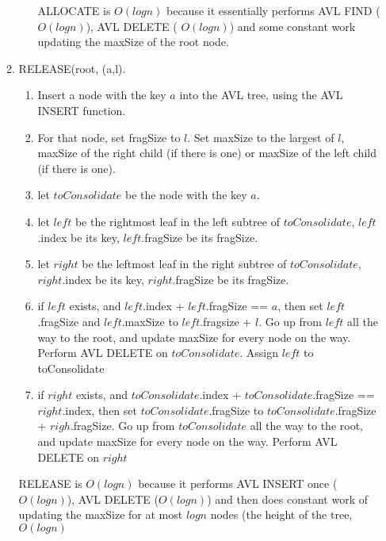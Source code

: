 \documentclass[11pt]{article}
\begin{document}
\begin{enumerate}
\begin{enumerate}
\begin{enumerate}
				
					ALLOCATE is $O(log n)$ because it essentially performs AVL FIND  ($O(log n)$), AVL DELETE ( $O(log n)$) and some constant work updating the maxSize of the root node.
				\end{enumerate}
				\item RELEASE(root, (a,l). 
				\begin{enumerate}
					\item Insert a node with the key $a$ into the AVL tree, using the AVL INSERT function. 
					\item For that node, set fragSize to $l$. Set maxSize to the largest of $l$, maxSize of the right child (if there is one) or maxSize of the left child (if there is one).
					\item let $toConsolidate$ be the node with the key $a$.
					\item let $left$ be the rightmost leaf in the left subtree of  $toConsolidate$, $left$.index be its key, $left$.fragSize be its fragSize.
					\item let $right$ be the leftmost leaf in the right subtree of $toConsolidate$, $right$.index be its key, $right$.fragSize be its fragSize.
					\item if $left$ exists, and $left$.index + $left$.fragSize == $a$, then set $left$.fragSize and $left$.maxSize to $left$.fragsize + $l$. Go up from $left$ all the way to the root, and update maxSize for every node on the way. Perform AVL DELETE on $toConsolidate$. Assign $left$ to toConsolidate
					\item if $right$ exists, and $toConsolidate$.index + $toConsolidate$.fragSize == $right$.index, then set $toConsolidate$.fragSize to $toConsolidate$.fragSize + $righ$.fragSize. Go up from $toConsolidate$ all the way to the root, and update maxSize for every node on the way. Perform AVL DELETE on $right$
				\end{enumerate}
				
				RELEASE is $O(logn)$ because it performs AVL INSERT once ($O(logn)$), AVL DELETE ($O(logn)$) and then does constant work of updating the maxSize for at most $logn$ nodes (the height of the tree, $O(logn)$
				
			\end{enumerate}
	\end{enumerate}
\end{document}
